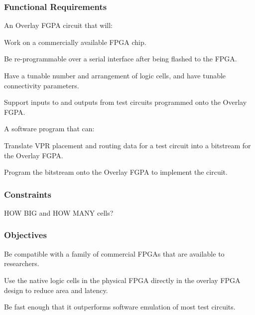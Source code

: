 \subsubsection{Functional Requirements}

An Overlay FGPA circuit that will:

\begin{itemlist}
	\item Work on a commercially available FPGA chip.
	\item Be re-programmable over a serial interface after being flashed to the FPGA.
	\item Have a tunable number and arrangement of logic cells, and have tunable connectivity parameters. 
	\item Support inputs to and outputs from test circuits programmed onto the Overlay FGPA.
\end{itemlist}

A software program that can:
\begin{itemlist}
	\item Translate VPR placement and routing data for a test circuit into a bitstream for the Overlay FGPA.
	\item Program the bitstream onto the Overlay FGPA to implement the circuit.
\end{itemlist}

\subsubsection{Constraints}

\begin{itemlist}
	\item HOW BIG and HOW MANY cells?
\end{itemlist}


\subsubsection{Objectives}

\begin{itemlist}
	\item Be compatible with a family of commercial FPGAs that are available to researchers.
	\item Use the native logic cells in the physical FPGA directly in the overlay FPGA design to reduce area and latency.
	\item Be fast enough that it outperforms software emulation of most test circuits.
\end{itemlist}

